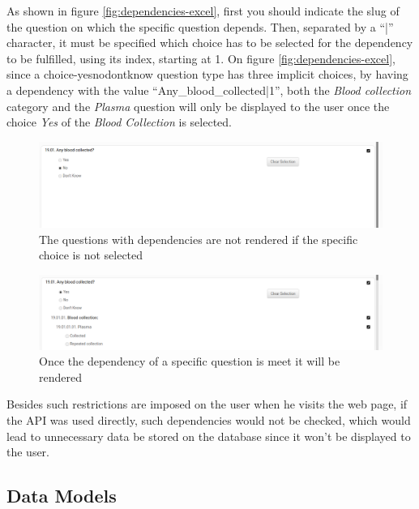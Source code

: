 As shown in figure \ref{fig:dependencies-excel}, first you should indicate the slug of the question on which the specific question depends.
Then, separated by a ``|'' character, it must be specified which choice has to be selected for the dependency to be fulfilled, using its index, starting at 1.
On figure \ref{fig:dependencies-excel}, since a choice-yesnodontknow question type has three implicit choices, by having a dependency with the value ``Any\_blood\_collected|1'', both the \textit{Blood collection} category and the \textit{Plasma} question will only be displayed to the user once the choice \textit{Yes} of the \textit{Blood Collection} is selected.

\begin{figure}[h]
    \center
    \includegraphics[width=0.75\linewidth]{dependencies-no}
    \caption{The questions with dependencies are not rendered if the specific choice is not selected}
    \label{fig:dependencies-no}
\end{figure}

\begin{figure}[h]
    \center
    \includegraphics[width=0.75\linewidth]{dependencies-yes}
    \caption{Once the dependency of a specific question is meet it will be rendered}
    \label{fig:dependencies-yes}
\end{figure}

Besides such restrictions are imposed on the user when he visits the web page, if the API was used directly, such dependencies would not be checked, which would lead to unnecessary data be stored on the database since it won't be displayed to the user.

\subsection{Data Models}


